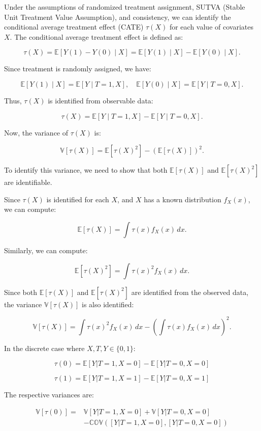 \documentclass{article}
\begin{document}
Under the assumptions of randomized treatment assignment, SUTVA (Stable Unit Treatment Value Assumption), and consistency, we can identify the conditional average treatment effect (CATE) \(\tau(X)\) for each value of covariates \(X\). The conditional average treatment effect is defined as:

\[
\tau(X) = \mathbb{E}[Y(1) - Y(0) \mid X] = \mathbb{E}[Y(1) \mid X] - \mathbb{E}[Y(0) \mid X].
\]

Since treatment is randomly assigned, we have:

\[
\mathbb{E}[Y(1) \mid X] = \mathbb{E}[Y \mid T = 1, X], \quad \mathbb{E}[Y(0) \mid X] = \mathbb{E}[Y \mid T = 0, X].
\]

Thus, \(\tau(X)\) is identified from observable data:

\[
\tau(X) = \mathbb{E}[Y \mid T = 1, X] - \mathbb{E}[Y \mid T = 0, X].
\]

Now, the variance of \(\tau(X)\) is:

\[
\mathbb{V}[\tau(X)] = \mathbb{E}\left[ \tau(X)^2 \right] - \left( \mathbb{E}\left[ \tau(X) \right] \right)^2.
\]

To identify this variance, we need to show that both \(\mathbb{E}\left[ \tau(X) \right]\) and \(\mathbb{E}\left[ \tau(X)^2 \right]\) are identifiable.

Since \(\tau(X)\) is identified for each \(X\), and \(X\) has a known distribution \(f_X(x)\), we can compute:

\[
\mathbb{E}\left[ \tau(X) \right] = \int \tau(x) f_X(x) \, dx.
\]

Similarly, we can compute:

\[
\mathbb{E}\left[ \tau(X)^2 \right] = \int \tau(x)^2 f_X(x) \, dx.
\]

Since both \(\mathbb{E}\left[ \tau(X) \right]\) and \(\mathbb{E}\left[ \tau(X)^2 \right]\) are identified from the observed data, the variance \(\mathbb{V}[\tau(X)]\) is also identified:

\[
\mathbb{V}[\tau(X)] = \int \tau(x)^2 f_X(x) \, dx - \left( \int \tau(x) f_X(x) \, dx \right)^2.
\]

In the discrete case where $X, T, Y \in \{0, 1\}$:

\[
\tau(0) = \mathbb{E}[Y | T = 1, X = 0] - \mathbb{E}[Y | T = 0, X = 0]
\]

\[
\tau(1) = \mathbb{E}[Y | T = 1, X = 1] - \mathbb{E}[Y | T = 0, X = 1]
\]

The respective variances are:

\begin{align*}
  \mathbb{V}[\tau(0)] =& \mathbb{V}[Y | T = 1, X = 0] + \mathbb{V}[Y | T = 0, X = 0] \\
  &- \mathbb{COV}([Y | T = 1, X = 0], [Y | T = 0, X = 0])
\end{align*}
\end{document}
